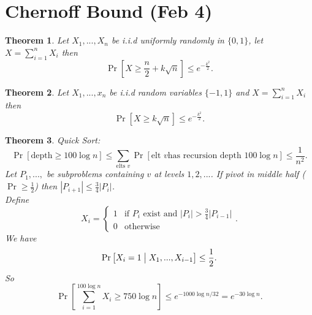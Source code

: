 \documentclass[a4paper]{article}
\newtheorem{thm}{Theorem}[section]
\begin{document}
\section{Chernoff Bound (Feb 4)}
\begin{thm}
    Let $X_1,...,X_n$ be i.i.d uniformly randomly in $ \{0, 1\}$, let $X=\sum_{i=1}^n X_i$ then \[
    \Pr\left [X\geq \frac{n}{2}+k\sqrt{n}\right ]\leq e^{-\frac{k^2}{2}}
    .\]
\end{thm}
\begin{thm}
    Let $X_1,...,x_n$ be i.i.d random variables $ \{-1,1\}$ and $X=\sum_{i=1}^n X_i$ then \[
    \Pr\left [X\geq k\sqrt{n}\right ]\leq e^{-\frac{k^2}{2}}
    .\]
\end{thm}
\begin{thm}
    Quick Sort:
    \[
    \Pr[\text{depth} \geq 100 \log n]\leq \sum_{\text{elts } v}\Pr[\text{elt } v \text{has recursion depth } 100\log n ]\leq \frac{1}{n^2}
    .\] 
    Let $P_1,...,$ be subproblems containing $v$ at levels $1,2,...$. If pivot in middle half ($\Pr\geq \frac{1}{2}$) then $|P_{i+1}|\leq \frac{3}{4}|P_i|$. \\
    Define \[
        X_i=\begin{cases}
            1 & \text{if $P_i$ exist and $|P_i|>\frac{3}{4}|P_{i-1}|$}\\
            0 & \text{otherwise}
        \end{cases}
    .\]
    We have \[
    \Pr\left [X_i=1 \bigm | X_{1},...,X_{i-1} \right ]\leq \frac{1}{2}
    .\] 
    So \[
    \Pr\left [\sum_{i=1}^{100 \log n} X_i \geq 750\log n \right ]\leq e^{-1000\log n/32}=e^{-30\log n}
    .\] 
\end{thm}
\newpage
\end{document}
